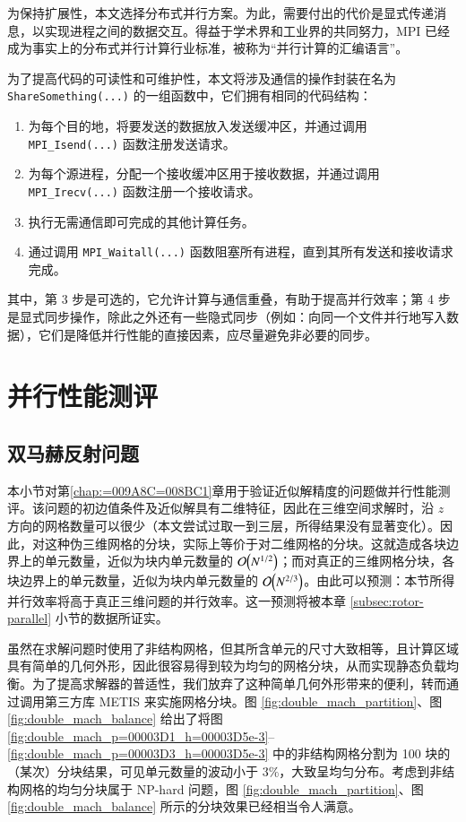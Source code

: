 为保持扩展性，本文选择分布式并行方案。为此，需要付出的代价是显式传递消息，以实现进程之间的数据交互。得益于学术界和工业界的共同努力，MPI
已经成为事实上的分布式并行计算行业标准，被称为“并行计算的汇编语言”。

为了提高代码的可读性和可维护性，本文将涉及通信的操作封装在名为 \texttt{ShareSomething(...)} 的一组函数中，它们拥有相同的代码结构：
\begin{enumerate}
\item 为每个目的地，将要发送的数据放入发送缓冲区，并通过调用 \texttt{MPI\_Isend(...)} 函数注册发送请求。
\item 为每个源进程，分配一个接收缓冲区用于接收数据，并通过调用 \texttt{MPI\_Irecv(...)} 函数注册一个接收请求。
\item 执行无需通信即可完成的其他计算任务。
\item 通过调用 \texttt{MPI\_Waitall(...)} 函数阻塞所有进程，直到其所有发送和接收请求完成。
\end{enumerate}
其中，第 3 步是可选的，它允许计算与通信重叠，有助于提高并行效率；第 4 步是显式同步操作，除此之外还有一些隐式同步（例如：向同一个文件并行地写入数据），它们是降低并行性能的直接因素，应尽量避免非必要的同步。

\section{并行性能测评}

\subsection{双马赫反射问题}

本小节对第\ref{chap:=009A8C=008BC1}章用于验证近似解精度的问题做并行性能测评。该问题的初边值条件及近似解具有二维特征，因此在三维空间求解时，沿
$z$ 方向的网格数量可以很少（本文尝试过取一到三层，所得结果没有显著变化）。因此，对这种伪三维网格的分块，实际上等价于对二维网格的分块。这就造成各块边界上的单元数量，近似为块内单元数量的
$\order{N^{1/2}}$；而对真正的三维网格分块，各块边界上的单元数量，近似为块内单元数量的 $\order{N^{2/3}}$。由此可以预测：本节所得并行效率将高于真正三维问题的并行效率。这一预测将被本章
\ref{subsec:rotor-parallel} 小节的数据所证实。

虽然在求解问题时使用了非结构网格，但其所含单元的尺寸大致相等，且计算区域具有简单的几何外形，因此很容易得到较为均匀的网格分块，从而实现静态负载均衡。为了提高求解器的普适性，我们放弃了这种简单几何外形带来的便利，转而通过调用第三方库
METIS 来实施网格分块。图 \ref{fig:double_mach_partition}、图
\ref{fig:double_mach_balance} 给出了将图 \ref{fig:double_mach_p=00003D1_h=00003D5e-3}–\ref{fig:double_mach_p=00003D3_h=00003D5e-3}
中的非结构网格分割为 100 块的（某次）分块结果，可见单元数量的波动小于 $3\%$，大致呈均匀分布。考虑到非结构网格的均匀分块属于
NP-hard 问题，图 \ref{fig:double_mach_partition}、图 \ref{fig:double_mach_balance}
所示的分块效果已经相当令人满意。

